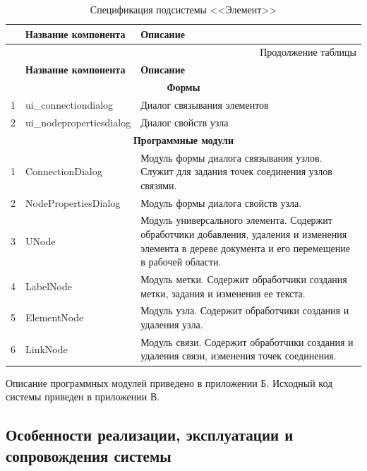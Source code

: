 \small
\singlespacing
\begin{longtable}[h]{|p{}|p{}|p{}|}
  \caption{Спецификация подсистемы <<Элемент>>}
	\\ \hline
	  \textbf{\No}                  &
	  \textbf{Название компонента}  &
	  \textbf{Описание}
	\\ \hline
  \endfirsthead

  \multicolumn{3}{r}{Продолжение таблицы \thetable{}}
  \\ \hline
	  \textbf{\No}                  &
	  \textbf{Название компонента}  &
	  \textbf{Описание}
	\\ \hline
  \endhead

  \multicolumn{3}{|c|}{\textbf{Формы}} \\
  \hline
  1 & ui\_connectiondialog & Диалог связывания элементов \\ \hline
  2 & ui\_nodepropertiesdialog & Диалог свойств узла \\ \hline

  \multicolumn{3}{|c|}{\textbf{Программные модули}} \\
  \hline
  1 & ConnectionDialog & Модуль формы диалога связывания узлов. Служит для задания точек соединения узлов связями. \\ \hline
  2 & NodePropertiesDialog & Модуль формы диалога свойств узла. \\ \hline
  3 & UNode & Модуль универсального элемента. Содержит обработчики добавления, удаления и изменения элемента в дереве документа и его перемещение в рабочей области. \\ \hline
  4 & LabelNode & Модуль метки. Содержит обработчики создания метки, задания и изменения ее текста. \\ \hline
  5 & ElementNode & Модуль узла. Содержит обработчики создания и удаления узла. \\ \hline
  6 & LinkNode & Модуль связи. Содержит обработчики создания и удаления связи, изменения точек соединения. \\ \hline
\end{longtable}
\normalsize
\onehalfspacing

Описание программных модулей приведено в приложении Б. Исходный код системы приведен в приложении В.

\subsection{Особенности реализации, эксплуатации и сопровождения системы}

